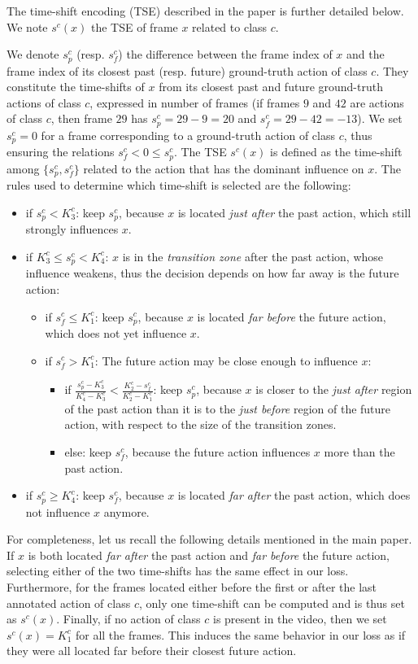 \documentclass[10pt,twocolumn,letterpaper]{article}
\begin{document}
The time-shift encoding (TSE) described in the paper is further detailed below. We note $s^c(x)$ the TSE of frame $x$ related to class $c$.

We denote $s^c_p$ (resp. $s^c_f$) the difference between the frame index of $x$ and the frame index of its closest past (resp. future) ground-truth action of class $c$. They constitute the time-shifts of $x$ from its closest past and future ground-truth actions of class $c$, expressed in number of frames (\ie if frames $9$ and $42$ are actions of class $c$, then frame $29$ has $s^c_p=29-9=20$ and $s^c_f=29-42=-13$). We set $s^c_p=0$ for a frame corresponding to a ground-truth action of class $c$, thus ensuring the relations $s^c_f < 0 \leq s^c_p$. 
The TSE $s^c(x)$ is defined as the time-shift among $\{s^c_p, s^c_f\}$ related to the action that has the dominant influence on $x$. The rules used to determine which time-shift is selected are the following:
\begin{itemize}
    \item if $s^c_p < K^c_3$: keep $s^c_p$, because $x$ is located \emph{just after} the past action, which still strongly influences $x$. \item if $K^c_3 \leq s^c_p < K^c_4$: $x$ is in the \emph{transition zone} after the past action, whose influence weakens, thus the decision depends on how far away is the future action:
    \begin{itemize}
        \item if $s^c_f \leq K^c_1$: keep $s^c_p$, because $x$ is located \emph{far before} the future action, which does not yet influence $x$.
        \item if $s^c_f > K^c_1$:
        The future action may be close enough to influence $x$:
        \begin{itemize}
            \item if $\frac{s^c_p-K^c_3}{K^c_4-K^c_3} < \frac{K^c_2-s^c_f}{K^c_2-K^c_1}$: keep $s^c_p$, because $x$ is closer to the \emph{just after} region of the past action than it is to the \emph{just before} region of the future action, with respect to the size of the transition zones. \item else: keep $s^c_f$, because the future action influences $x$ more than the past action.
        \end{itemize}
    \end{itemize}
    \item if $s^c_p \geq K^c_4$: keep $s^c_f$, because $x$ is located \emph{far after} the past action, which does not influence $x$ anymore.
\end{itemize}
For completeness, let us recall the following details mentioned in the main paper.
If $x$ is both located \emph{far after} the past action and \emph{far before} the future action, selecting either of the two time-shifts has the same effect in our loss. Furthermore, for the frames located either before the first or after the last annotated action of class $c$, only one time-shift can be computed and is thus set as $s^c(x)$. Finally, if no action of class $c$ is present in the video, then we set $s^c(x)=K^c_1$ for all the frames. This induces the same behavior in our loss as if they were all located far before their closest future action.
\end{document}
